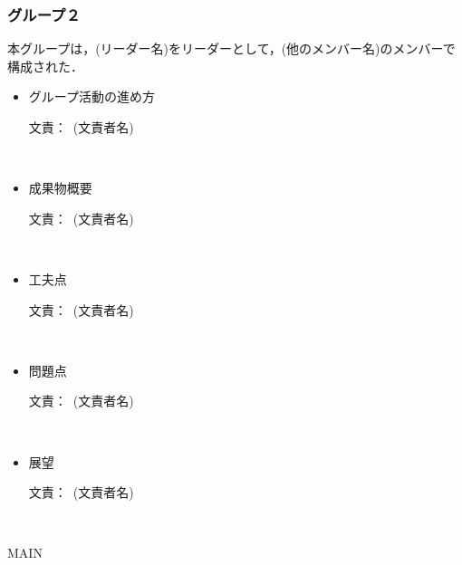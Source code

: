 \documentclass[a4paper]{jarticle}
\newcommand{\resp}[1]{\begin{flushright}文責：~#1\end{flushright}~\\}
\begin{document}
\fi

\subsubsection{グループ２}
    
    本グループは，(リーダー名)をリーダーとして，(他のメンバー名)のメンバーで構成された．

    \begin{itemize}
        \item グループ活動の進め方
        
        \resp{(文責者名)}


        \item 成果物概要
        
        \resp{(文責者名)}


        \item 工夫点
        
        \resp{(文責者名)}


        \item 問題点
        
        \resp{(文責者名)}


        \item 展望
        
        \resp{(文責者名)}


    \end{itemize}

\expandafter\ifx\csname MAIN \endcsname\relax
  
\end{document}
